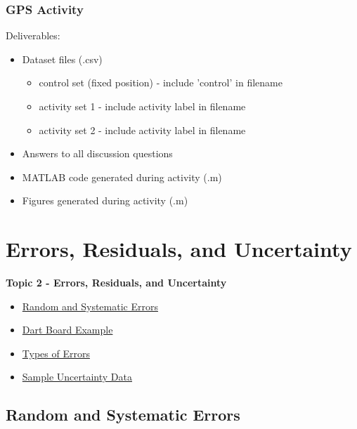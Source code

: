\documentclass[fleqn]{beamer} %
\newcommand{\sectionIItitle}{Errors, Residuals, and Uncertainty}
\newcommand{\sectionIsubsectionIVtitle}{GPS Activity}
\newcommand{\sectionIIsubsectionItitle}{Random and Systematic Errors}
\newcommand{\sectionIIsubsectionIItitle}{Dart Board Example}
\newcommand{\sectionIIsubsectionIIItitle}{Types of Errors}
\newcommand{\sectionIIsubsectionIVtitle}{Sample Uncertainty Data}
\begin{document}
			\begin{frame}
				\frametitle{\sectionIsubsectionIVtitle}
				Deliverables:
				\begin{itemize}
					\item Dataset files (.csv)
					\begin{itemize}
						\item control set (fixed position) - include 'control' in filename
						\item activity set 1 - include activity label in filename
						\item activity set 2 - include activity label in filename
					\end{itemize}
					\item Answers to all discussion questions
					\item MATLAB code generated during activity (.m)
					\item Figures generated during activity (.m)
				\end{itemize}
				


			\end{frame}

	\section{\sectionIItitle}\label{sectionII}

		\begin{frame}
			\large \textbf{Topic 2 - \sectionIItitle} \vspace{3mm}\\

			\begin{itemize}
				\item \hyperlink{sectionIIsubsectionI}{\sectionIIsubsectionItitle} \vspc %
				\item \hyperlink{sectionIIsubsectionII}{\sectionIIsubsectionIItitle} \vspc %
				\item \hyperlink{sectionIIsubsectionIII}{\sectionIIsubsectionIIItitle} \vspc %
				\item \hyperlink{sectionIIsubsectionIV}{\sectionIIsubsectionIVtitle} \vspc %
			\end{itemize}

		\end{frame}

		\subsection{\sectionIIsubsectionItitle}\label{sectionIIsubsectionI}
\end{document}

